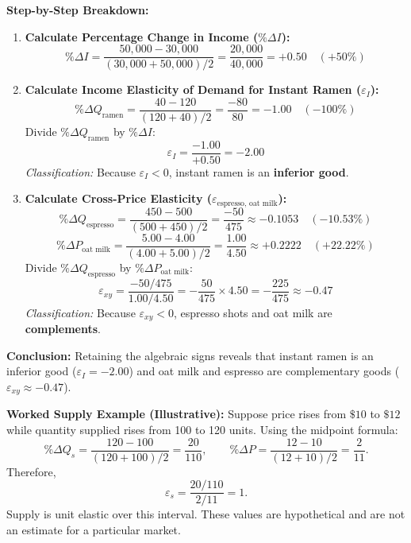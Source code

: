 \documentclass[11pt,letterpaper]{article}
\begin{document}
\noindent\textbf{Step-by-Step Breakdown:}
\begin{enumerate}
    \item \textbf{Calculate Percentage Change in Income ($\%\Delta I$):}
    \[
    \%\Delta I = \frac{50{,}000 - 30{,}000}{(30{,}000 + 50{,}000)/2} = \frac{20{,}000}{40{,}000} = +0.50 \quad (+50\%)
    \]

    \item \textbf{Calculate Income Elasticity of Demand for Instant Ramen ($\varepsilon_I$):}
    \[
    \%\Delta Q_{\text{ramen}} = \frac{40 - 120}{(120 + 40)/2} = \frac{-80}{80} = -1.00 \quad (-100\%)
    \]
    Divide $\%\Delta Q_{\text{ramen}}$ by $\%\Delta I$:
    \[
    \varepsilon_I = \frac{-1.00}{+0.50} = \mathbf{-2.00}
    \]
    \emph{Classification:} Because $\varepsilon_I < 0$, instant ramen is an \textbf{inferior good}.

    \item \textbf{Calculate Cross-Price Elasticity ($\varepsilon_{\text{espresso, oat milk}}$):}
    \[
    \%\Delta Q_{\text{espresso}} = \frac{450 - 500}{(500 + 450)/2} = \frac{-50}{475} \approx -0.1053 \quad (-10.53\%)
    \]
    \[
    \%\Delta P_{\text{oat milk}} = \frac{5.00 - 4.00}{(4.00 + 5.00)/2} = \frac{1.00}{4.50} \approx +0.2222 \quad (+22.22\%)
    \]
    Divide $\%\Delta Q_{\text{espresso}}$ by $\%\Delta P_{\text{oat milk}}$:
    \[
    \varepsilon_{xy} = \frac{-50/475}{1.00/4.50} = -\frac{50}{475} \times 4.50 = -\frac{225}{475} \approx \mathbf{-0.47}
    \]
    \emph{Classification:} Because $\varepsilon_{xy} < 0$, espresso shots and oat milk are \textbf{complements}.
\end{enumerate}
\textbf{Conclusion:} Retaining the algebraic signs reveals that instant ramen is an inferior good ($\varepsilon_I = -2.00$) and oat milk and espresso are complementary goods ($\varepsilon_{xy} \approx -0.47$).

\noindent\textbf{Worked Supply Example (Illustrative):}
Suppose price rises from $\$10$ to $\$12$ while quantity supplied rises from 100 to 120 units. Using the midpoint formula:
\[
\%\Delta Q_s=\frac{120-100}{(120+100)/2}=\frac{20}{110},
\qquad
\%\Delta P=\frac{12-10}{(12+10)/2}=\frac{2}{11}.
\]
Therefore,
\[
\varepsilon_s=\frac{20/110}{2/11}=1.
\]
Supply is unit elastic over this interval. These values are hypothetical and are not an estimate for a particular market.
\end{document}
